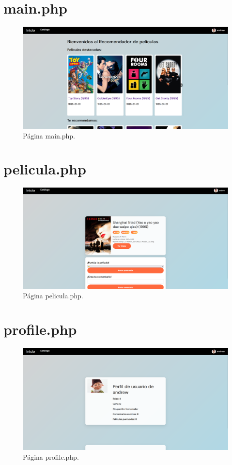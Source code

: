 \documentclass[a4paper, 12pt]{report}
\begin{document}
    \section{main.php}
    \begin{figure}[H]
        \centering
        \includegraphics[scale=0.20]{resources/img/main.png}
        \caption{Página main.php.}
        \label{fig:main}
    \end{figure}
    \section{pelicula.php}
    \begin{figure}[H]
        \centering
        \includegraphics[scale=0.20]{resources/img/movie.png}
        \caption{Página pelicula.php.}
        \label{fig:pelicula}
    \end{figure}
    \section{profile.php}
    \begin{figure}[H]
        \centering
        \includegraphics[scale=0.20]{resources/img/profile.png}
        \caption{Página profile.php.}
        \label{fig:profile}
    \end{figure}
\end{document}
